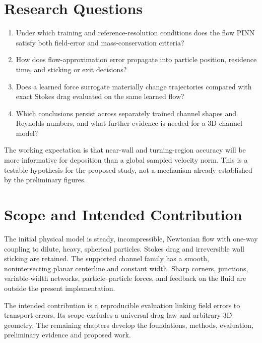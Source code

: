 \section{Research Questions}
\begin{enumerate}[label=RQ\arabic*.]
\item Under which training and reference-resolution conditions does the
flow PINN satisfy both field-error and mass-conservation criteria?
\item How does flow-approximation error propagate into particle position,
residence time, and sticking or exit decisions?
\item Does a learned force surrogate materially change trajectories compared
with exact Stokes drag evaluated on the same learned flow?
\item Which conclusions persist across separately trained channel shapes and
Reynolds numbers, and what further evidence is needed for a 3D channel model?
\end{enumerate}
The working expectation is that near-wall and turning-region accuracy will
be more informative for deposition than a global sampled velocity norm.
This is a testable hypothesis for the proposed study, not a mechanism
already established by the preliminary figures.

\section{Scope and Intended Contribution}
The initial physical model is steady, incompressible, Newtonian flow with
one-way coupling to dilute, heavy, spherical particles. Stokes drag and
irreversible wall sticking are retained. The supported channel family has
a smooth, nonintersecting planar centerline and constant width. Sharp
corners, junctions, variable-width networks, particle--particle forces,
and feedback on the fluid are outside the present implementation.

The intended contribution is a reproducible evaluation linking field errors
to transport errors. Its scope excludes a universal drag law and arbitrary
3D geometry. The remaining chapters develop the foundations, methods,
evaluation, preliminary evidence and proposed work.
